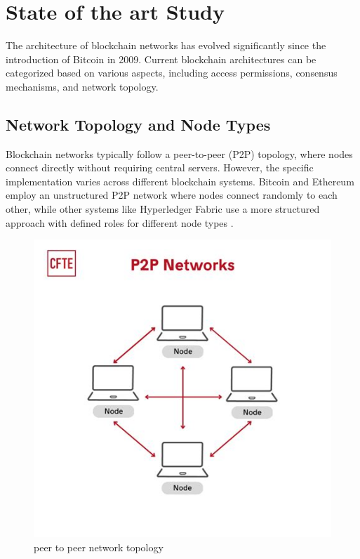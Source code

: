 \documentclass[twoside]{article}
\begin{document}
\section{State of the art Study}
The architecture of blockchain networks has evolved significantly since the introduction of Bitcoin in 2009. Current blockchain architectures can be categorized based on various aspects, including access permissions, consensus mechanisms, and network topology.

\subsection{Network Topology and Node Types}
Blockchain networks typically follow a peer-to-peer (P2P) topology, where nodes connect directly without requiring central servers. However, the specific implementation varies across different blockchain systems. Bitcoin and Ethereum employ an unstructured P2P network where nodes connect randomly to each other, while other systems like Hyperledger Fabric use a more structured approach with defined roles for different node types \cite{patnaik}.

\begin{figure}[H]
  \centering
  \includegraphics[width=1\textwidth]{imgs/p2p.jpeg}
  \caption{peer to peer network topology}
  \label{fig:1}
\end{figure}
\end{document}
